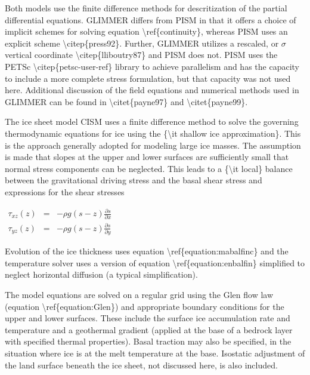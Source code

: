 Both models use the finite difference methods for descritization of the
partial differential equations. GLIMMER differs from PISM in that it
offers a choice of implicit schemes for solving equation
\textbackslash{}ref\{continuity\}, whereas PISM uses an explicit scheme
\textbackslash{}citep\{press92\}. Further, GLIMMER utilizes a rescaled,
or $\sigma$ vertical coordinate \textbackslash{}citep\{lliboutry87\} and
PISM does not. PISM uses the PETSc
\textbackslash{}citep\{petsc-user-ref\} library to achieve parallelism
and has the capacity to include a more complete stress formulation, but
that capacity was not used here. Additional discussion of the field
equations and numerical methods used in GLIMMER can be found in
\textbackslash{}citet\{payne97\} and \textbackslash{}citet\{payne99\}.

The ice sheet model CISM uses a finite difference method to solve the
governing thermodynamic equations for ice using the \{\textbackslash{}it
shallow ice approximation\}. This is the approach generally adopted for
modeling large ice masses. The assumption is made that slopes at the
upper and lower surfaces are sufficiently small that normal stress
components can be neglected. This leads to a \{\textbackslash{}it
local\} balance between the gravitational driving stress and the basal
shear stress and expressions for the shear stresses

$\begin{matrix}
\tau_{xz}(z)&=&-\rho g \left(s - z \right) \frac{\partial s}{\partial x}  \\
\tau_{yz}(z)&=&-\rho g \left(s - z \right) \frac{\partial s}{\partial y}
\end{matrix}$

Evolution of the ice thickness uses equation
\textbackslash{}ref\{equation:mabalfinc\} and the temperature solver
uses a version of equation \textbackslash{}ref\{equation:enbalfin\}
simplified to neglect horizontal diffusion (a typical simplification).

The model equations are solved on a regular grid using the Glen flow law
(equation \textbackslash{}ref\{equation:Glen\}) and appropriate boundary
conditions for the upper and lower surfaces. These include the surface
ice accumulation rate and temperature and a geothermal gradient (applied
at the base of a bedrock layer with specified thermal properties). Basal
traction may also be specified, in the situation where ice is at the
melt temperature at the base. Isostatic adjustment of the land surface
beneath the ice sheet, not discussed here, is also included.

